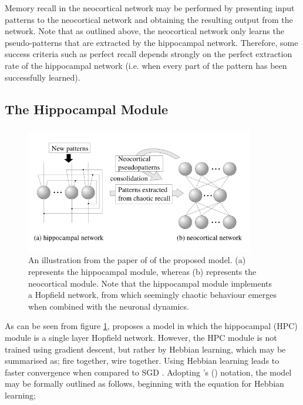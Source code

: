 Memory recall in the neocortical network may be performed by presenting input patterns to the neocortical network and obtaining the resulting output from the network. Note that as outlined above, the neocortical network only learns the pseudo-patterns that are extracted by the hippocampal network. Therefore, some success criteria such as perfect recall depends strongly on the perfect extraction rate of the hippocampal network (i.e. when every part of the pattern has been successfully learned).

\subsection{The Hippocampal Module}
\subsubsection{\cite{Hattori2010}}
\begin{figure}
\centering
\includegraphics[width=10cm]{fig/hattori2010_model_structure}
\caption{An illustration from the paper of \cite{Hattori2010} of the proposed model. (a) represents the hippocampal module, whereas (b) represents the neocortical module. Note that the hippocampal module implements a Hopfield network, from which seemingly chaotic behaviour emerges when combined with the neuronal dynamics.}
\label{fig:hattori2010_model_structure}
\end{figure}

As can be seen from figure \ref{fig:hattori2010_model_structure}, \cite{Hattori2010} proposes a model in which the hippocampal (HPC) module is a single layer Hopfield network. However, the HPC module is not trained using gradient descent, but rather by Hebbian learning, which may be summarised as; fire together, wire together. Using Hebbian learning leads to faster convergence when compared to SGD \citep{Hattori2010}. Adopting \citeauthor{Hattori2010}'s (\citeyear{Hattori2010}) notation, the model may be formally outlined as follows, beginning with the equation for Hebbian learning;

